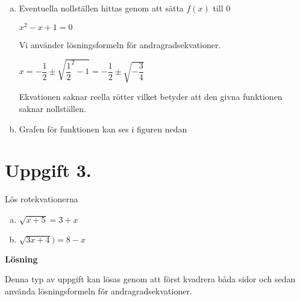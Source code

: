 \documentclass{article}
\begin{document}
\begin{enumerate}[(a)]
\item 
Eventuella nollställen hittas genom att sätta $f(x)$ till $0$

$x^2-x+1=0$

Vi använder lösningsformeln för andragradsekvationer.

$x=-\dfrac{1}{2}\pm\sqrt{\dfrac{1}{2}^2-1}=-\dfrac{1}{2}\pm\sqrt{-\dfrac{3}{4}}$

Ekvationen saknar reella rötter vilket betyder att den givna funktionen saknar nollställen.

\item Grafen för funktionen kan ses i figuren nedan
\end{enumerate}

\section*{Uppgift 3.}
Lös rotekvationerna
\begin{enumerate}[(a)]
\item $\sqrt{x+5}=3+x$
\item $\sqrt{3x+4})=8-x$
\end{enumerate}

\textbf{Lösning}

Denna typ av uppgift kan lösas genom att först kvadrera båda sidor och sedan använda lösningsformeln för andragradsekvationer.
\end{document}
